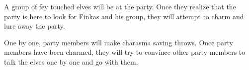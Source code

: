 A group of fey touched elves will be at the party.
Once they realize that the party is here to look for Finkas and his group, they will attempt to charm and lure away the party.

One by one, party members will make charasma saving throws.
Once party members have been charmed, they will try to convince other party members to talk the elves one by one and go with them.
